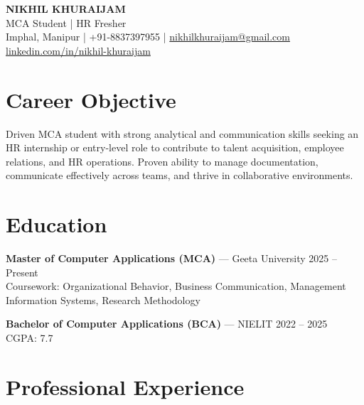 \documentclass[10pt, a4paper]{article}
\begin{document}
\begin{center}
  {\Large\bfseries NIKHIL KHURAIJAM}\\[3pt]
  MCA Student | HR Fresher\\[2pt]
  \small Imphal, Manipur | +91-8837397955 | \href{mailto:nikhilkhuraijam@gmail.com}{nikhilkhuraijam@gmail.com}\\
  \href{https://www.linkedin.com/in/nikhil-khuraijam-b759292a4/}{linkedin.com/in/nikhil-khuraijam}
\end{center}

\vspace{6pt}

\section{Career Objective}

Driven MCA student with strong analytical and communication skills seeking an HR internship or entry-level role to contribute to talent acquisition, employee relations, and HR operations. Proven ability to manage documentation, communicate effectively across teams, and thrive in collaborative environments.

\vspace{4pt}

\section{Education}

\noindent\textbf{Master of Computer Applications (MCA)} — Geeta University \hfill 2025 – Present\\
\small Coursework: Organizational Behavior, Business Communication, Management Information Systems, Research Methodology

\vspace{3pt}
\noindent\textbf{Bachelor of Computer Applications (BCA)} — NIELIT \hfill 2022 – 2025\\
\small CGPA: 7.7

\vspace{6pt}

\section{Professional Experience}
\end{document}
